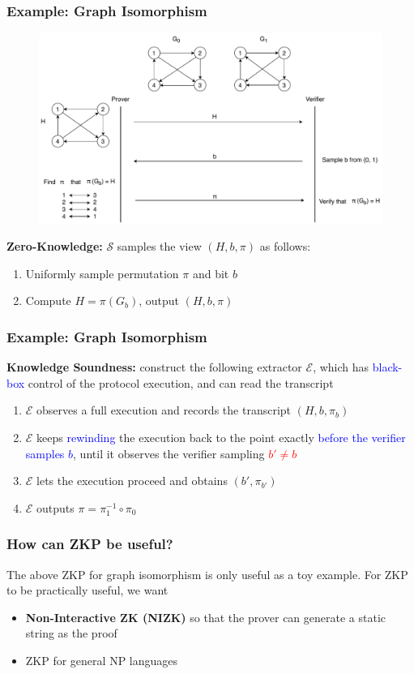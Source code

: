\documentclass{beamer}
\newcommand{\blue}[1]{\textcolor{blue}{#1}}
\newcommand{\red}[1]{\textcolor{red}{#1}}
\begin{document}
\frame
{
  \frametitle{Example: Graph Isomorphism}

  \onslide<+->\begin{figure}[ht!]
  \includegraphics[width=\textwidth]{images/ZKP-Graph-Isomorphism.pdf}
  \end{figure}
  \onslide<+-> \textbf{Zero-Knowledge:} $\mathcal{S}$ samples the view $(H,b,\pi)$ as follows:
  \begin{enumerate}
    \item Uniformly sample permutation $\pi$ and bit $b$
    \item Compute $H=\pi(G_b)$, output $(H,b,\pi)$
  \end{enumerate}
}

\frame
{
  \frametitle{Example: Graph Isomorphism}
  \onslide<+->\textbf{Knowledge Soundness:} construct the following extractor $\mathcal{E}$, which has \blue{black-box} control of the protocol execution, and can read the transcript
  \begin{enumerate}
    \item<+-> $\mathcal{E}$ observes a full execution and records the transcript $(H,b,\pi_b)$
    \item<+-> $\mathcal{E}$ keeps \blue{rewinding} the execution back to the point exactly \blue{before the verifier samples $b$}, until it observes the verifier sampling \red{$b'\neq b$}
    \item<+-> $\mathcal{E}$ lets the execution proceed and obtains $(b',\pi_{b'})$
    \item<+-> $\mathcal{E}$ outputs $\pi=\pi_1^{-1}\circ\pi_0$
  \end{enumerate}
}

{
  \frametitle{How can ZKP be useful?}

  \onslide<+-> The above ZKP for graph isomorphism is only useful as a toy example.
  For ZKP to be practically useful, we want
  \begin{itemize}
    \item<+-> \textbf{Non-Interactive ZK (NIZK)} so that the prover can generate a static string as the proof
    \item<+-> ZKP for general NP languages
  \end{itemize}
}
\end{document}
